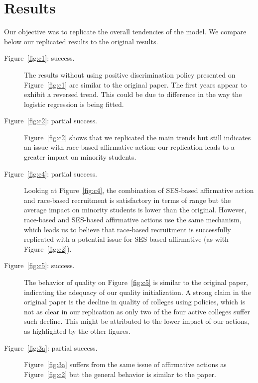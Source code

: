 \section{Results}\label{sec:results}

Our objective was to replicate the overall tendencies of the model.
We compare below our replicated results to the original results.

\begin{description}

\item[Figure~\ref{fig:c1}: success.] The results without using positive discrimination policy presented on Figure~\ref{fig:c1} are similar to the original paper.
The first years appear to exhibit a reversed trend. This could be due to difference in the way the logistic regression is being fitted.

\item[Figure~\ref{fig:c2}: partial success.] Figure~\ref{fig:c2} shows that we replicated the main trends but still indicates an issue with race-based affirmative action: our replication leads to a greater impact on minority students.

\item [Figure~\ref{fig:c4}: partial success.] Looking at Figure~\ref{fig:c4}, the combination of SES-based affirmative action and race-based recruitment is satisfactory in terms of range but the average impact on minority students is lower than the original.
However, race-based and SES-based affirmative actions use the same mechanism, which leads us to believe that race‐based recruitment is successfully replicated with a potential issue for SES-based affirmative (as with Figure~\ref{fig:c2}).

\item [Figure~\ref{fig:c5}: success.]  The behavior of quality on Figure~\ref{fig:c5} is similar to the original paper, indicating the adequacy of our quality initialization. A strong claim in the original paper is the decline in quality of colleges using policies, which is not as clear in our replication as only two of the four active colleges suffer such decline. This might be attributed to the lower impact of our actions, as highlighted by the other figures.

\item[Figure~\ref{fig:3a}: partial success.]  Figure~\ref{fig:3a} suffers from the same issue of affirmative actions as Figure~\ref{fig:c2} but the general behavior is similar to the paper.


\end{description}
